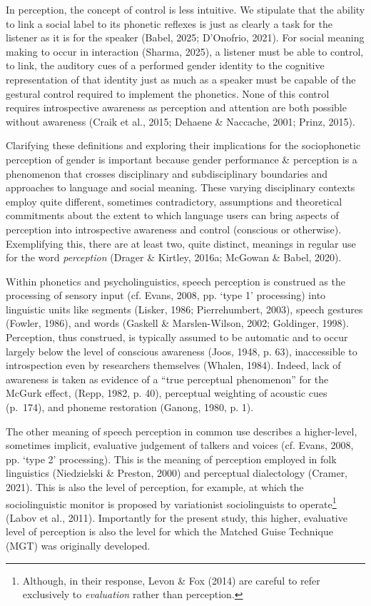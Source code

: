 \documentclass[
  letterpaper,
  DIV=11,
  numbers=noendperiod]{scrartcl}
\begin{document}
In perception, the concept of control is less intuitive. We stipulate
that the ability to link a social label to its phonetic reflexes is just
as clearly a task for the listener as it is for the speaker (Babel,
2025; D'Onofrio, 2021). For social meaning making to occur in
interaction (Sharma, 2025), a listener must be able to control, to link,
the auditory cues of a performed gender identity to the cognitive
representation of that identity just as much as a speaker must be
capable of the gestural control required to implement the phonetics.
None of this control requires introspective awareness as perception and
attention are both possible without awareness (Craik et al., 2015;
Dehaene \& Naccache, 2001; Prinz, 2015).

Clarifying these definitions and exploring their implications for the
sociophonetic perception of gender is important because gender
performance \& perception is a phenomenon that crosses disciplinary and
subdisciplinary boundaries and approaches to language and social
meaning. These varying disciplinary contexts employ quite different,
sometimes contradictory, assumptions and theoretical commitments about
the extent to which language users can bring aspects of perception into
introspective awareness and control (conscious or otherwise).
Exemplifying this, there are at least two, quite distinct, meanings in
regular use for the word \emph{perception} (Drager \& Kirtley, 2016a;
McGowan \& Babel, 2020).

Within phonetics and psycholinguistics, speech perception is construed
as the processing of sensory input (cf. Evans, 2008, pp. `type 1'
processing) into linguistic units like segments (Lisker, 1986;
Pierrehumbert, 2003), speech gestures (Fowler, 1986), and words (Gaskell
\& Marslen-Wilson, 2002; Goldinger, 1998). Perception, thus construed,
is typically assumed to be automatic and to occur largely below the
level of conscious awareness (Joos, 1948, p. 63), inaccessible to
introspection even by researchers themselves (Whalen, 1984). Indeed,
lack of awareness is taken as evidence of a ``true perceptual
phenomenon'' for the McGurk effect, (Repp, 1982, p. 40), perceptual
weighting of acoustic cues (p.~174), and phoneme restoration (Ganong,
1980, p. 1).

The other meaning of speech perception in common use describes a
higher-level, sometimes implicit, evaluative judgement of talkers and
voices (cf. Evans, 2008, pp. `type 2' processing). This is the meaning
of perception employed in folk linguistics (Niedzielski \& Preston,
2000) and perceptual dialectology (Cramer, 2021). This is also the level
of perception, for example, at which the sociolinguistic monitor is
proposed by variationist sociolinguists to operate\footnote{Although, in
  their response, Levon \& Fox (2014) are careful to refer exclusively
  to \emph{evaluation} rather than perception.} (Labov et al., 2011).
Importantly for the present study, this higher, evaluative level of
perception is also the level for which the Matched Guise Technique (MGT)
was originally developed.
\end{document}

